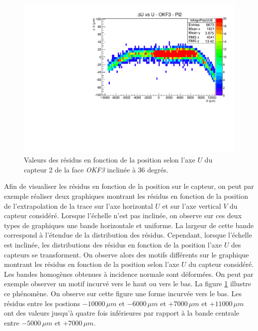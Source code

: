  \begin{figure}[!htb]
   \begin{center}
    \includegraphics[scale=0.50]{./figures/PLUME_deformations/Du_v_U_Pl2_OKF3_Loic.pdf}
    \caption{Valeurs des r\'esidus en fonction de la position selon l'axe $U$ du capteur 2 de la face \textit{OKF3} inclin\'ee \`a 36 degr\'es.}
    \label{fig:Res_vs_U_banana}
   \end{center}
  \end{figure}
  
  Afin de visualiser les r\'esidus en fonction de la position sur le capteur, on peut par exemple r\'ealiser deux graphiques montrant les r\'esidus en fonction de la position de l'extrapolation de la trace sur l'axe horizontal $U$ et sur l'axe vertical $V$ du capteur consid\'er\'e. Lorsque l'\'echelle n'est pas inclin\'ee, on observe sur ces deux types de graphiques une bande horizontale et uniforme. La largeur de cette bande correspond \`a l'\'etendue de la distribution des r\'esidus. Cependant, lorsque l'\'echelle est inclin\'ee, les distributions des r\'esidus en fonction de la position l'axe $U$ des capteurs se transforment. On observe alors des motifs diff\'erents sur le graphique montrant les r\'esidus en fonction de la position selon l'axe $U$ du capteur consid\'er\'e. Les bandes homog\`enes obtenues \`a incidence normale sont d\'eform\'ees. On peut par exemple observer un motif incurv\'e vers le haut ou vers le bas. La figure \ref{fig:Res_vs_U_banana} illustre ce ph\'enom\`ene. On observe sur cette figure une forme incurv\'ee vers le bas. Les r\'esidus entre les postions $-10000 \, \mu m$ et $-6000 \, \mu m$ et $+7000 \, \mu m$ et $+11000 \, \mu m$ ont des valeurs jusqu'\`a quatre fois inf\'erieures par rapport \`a la bande centrale entre $-5000 \, \mu m$ et $+7000 \, \mu m$.
  
